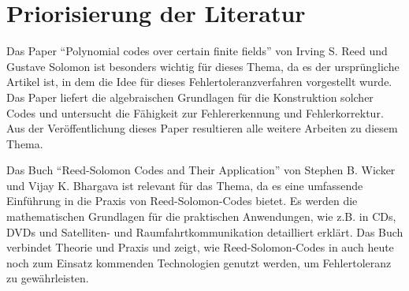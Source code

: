 \chapter{Priorisierung der Literatur}\label{ch:priorsisierung-der-literatur}
Das Paper \enquote{Polynomial codes over certain finite fields} \cite{reedPolynomialCodesCertain1960} von Irving S. Reed und Gustave Solomon ist besonders wichtig für dieses Thema, da es der ursprüngliche Artikel ist, in dem die Idee für dieses Fehlertoleranzverfahren vorgestellt wurde.
Das Paper liefert die algebraischen Grundlagen für die Konstruktion solcher Codes und untersucht die Fähigkeit zur Fehlererkennung und Fehlerkorrektur. Aus der Veröffentlichung dieses Paper resultieren alle weitere Arbeiten zu diesem Thema.

Das Buch \enquote{Reed-Solomon Codes and Their Application} \cite{wickerReedSolomonCodes1994} von Stephen B. Wicker und Vijay K. Bhargava ist relevant für das Thema, da es eine umfassende Einführung in die Praxis von Reed-Solomon-Codes bietet. 
Es werden die mathematischen Grundlagen für die praktischen Anwendungen, wie z.B. in CDs, DVDs und Satelliten- und Raumfahrtkommunikation detailliert erklärt. 
Das Buch verbindet Theorie und Praxis und zeigt, wie Reed-Solomon-Codes in auch heute noch zum Einsatz kommenden Technologien genutzt werden, um Fehlertoleranz zu gewährleisten.